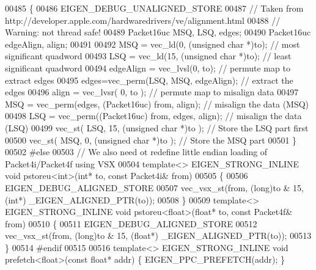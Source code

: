 \begin{DoxyCode}
{00485 \{
00486   EIGEN\_DEBUG\_UNALIGNED\_STORE
00487   \textcolor{comment}{// Taken from http://developer.apple.com/hardwaredrivers/ve/alignment.html}
00488   \textcolor{comment}{// Warning: not thread safe!}
00489   Packet16uc MSQ, LSQ, edges;
00490   Packet16uc edgeAlign, align;
00491 
00492   MSQ = vec\_ld(0, (\textcolor{keywordtype}{unsigned} \textcolor{keywordtype}{char} *)to);                     \textcolor{comment}{// most significant quadword}
00493   LSQ = vec\_ld(15, (\textcolor{keywordtype}{unsigned} \textcolor{keywordtype}{char} *)to);                    \textcolor{comment}{// least significant quadword}
00494   edgeAlign = vec\_lvsl(0, to);                              \textcolor{comment}{// permute map to extract edges}
00495   edges=vec\_perm(LSQ, MSQ, edgeAlign);                      \textcolor{comment}{// extract the edges}
00496   align = vec\_lvsr( 0, to );                                \textcolor{comment}{// permute map to misalign data}
00497   MSQ = vec\_perm(edges, (Packet16uc) from, align);          \textcolor{comment}{// misalign the data (MSQ)}
00498   LSQ = vec\_perm((Packet16uc) from, edges, align);          \textcolor{comment}{// misalign the data (LSQ)}
00499   vec\_st( LSQ, 15, (\textcolor{keywordtype}{unsigned} \textcolor{keywordtype}{char} *)to );                   \textcolor{comment}{// Store the LSQ part first}
00500   vec\_st( MSQ, 0, (\textcolor{keywordtype}{unsigned} \textcolor{keywordtype}{char} *)to );                    \textcolor{comment}{// Store the MSQ part}
00501 \}
00502 \textcolor{preprocessor}{#else}
00503 \textcolor{comment}{// We also need ot redefine little endian loading of Packet4i/Packet4f using VSX}
00504 \textcolor{keyword}{template}<> EIGEN\_STRONG\_INLINE \textcolor{keywordtype}{void} pstoreu<int>(\textcolor{keywordtype}{int}*       to, \textcolor{keyword}{const} Packet4i& from)
00505 \{
00506   EIGEN\_DEBUG\_ALIGNED\_STORE
00507   vec\_vsx\_st(from, (\textcolor{keywordtype}{long})to & 15, (\textcolor{keywordtype}{int}*) \_EIGEN\_ALIGNED\_PTR(to));
00508 \}
00509 \textcolor{keyword}{template}<> EIGEN\_STRONG\_INLINE \textcolor{keywordtype}{void} pstoreu<float>(\textcolor{keywordtype}{float}*   to, \textcolor{keyword}{const} Packet4f& from)
00510 \{
00511   EIGEN\_DEBUG\_ALIGNED\_STORE
00512   vec\_vsx\_st(from, (\textcolor{keywordtype}{long})to & 15, (\textcolor{keywordtype}{float}*) \_EIGEN\_ALIGNED\_PTR(to));
00513 \}
00514 \textcolor{preprocessor}{#endif}
00515 
00516 \textcolor{keyword}{template}<> EIGEN\_STRONG\_INLINE \textcolor{keywordtype}{void} prefetch<float>(\textcolor{keyword}{const} \textcolor{keywordtype}{float}* addr)    \{ EIGEN\_PPC\_PREFETCH(addr); \}
}
\end{DoxyCode}
